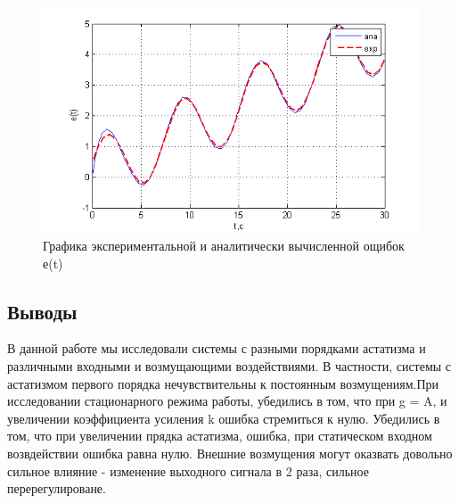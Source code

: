 \documentclass[a4paper, 10pt]{article}
\begin{document}
\begin{center}
	\begin{figure}[ht]
		\centering
			\includegraphics[width=0.7\linewidth]{17}
		\caption{Графика экспериментальной и аналитически вычисленной ощибок е(t)}
		\label{fig:17}
	\end{figure}
\end{center}
\clearpage
\begin{center}
	\section*{Выводы}
\end{center}

В данной работе мы исследовали системы с разными порядками астатизма и различными входными и возмущающими воздействиями. В частности, системы с астатизмом первого порядка нечувствительны к постоянным возмущениям.При исследовании стационарного режима работы, убедились в том, что при g = A, и увеличении коэффициента усиления k ошибка стремиться к нулю. 
Убедились в том, что при увеличении прядка астатизма, ошибка, при статическом входном возвдействии ошибка равна нулю.
Внешние возмущения могут оказвать довольно сильное влияние - изменение выходного сигнала в 2 раза, сильное перерегулироване.
\end{document}
